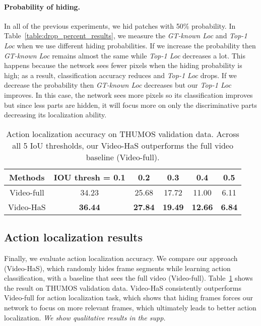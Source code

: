 \vspace{-10pt}
\paragraph{Probability of hiding.} In all of the previous experiments, we hid patches with 50\% probability. In Table~\ref{table:drop_percent_results}, we measure the \emph{GT-known Loc} and \emph{Top-1 Loc} when we use different hiding probabilities.  If we increase the probability then \emph{GT-known Loc} remains almost the same while \emph{Top-1 Loc} decreases a lot. This happens because the network sees fewer pixels when the hiding probability is high; as a result, classification accuracy reduces and \emph{Top-1 Loc} drops.  If we decrease the probability then \emph{GT-known Loc} decreases but our \emph{Top-1 Loc} improves.  In this case, the network sees more pixels so its classification improves but since less parts are hidden, it will focus more on only the discriminative parts decreasing its localization ability.


\begin{table}[t!]
              \begin{center}
                  \footnotesize
                  \begin{tabular}{| c | c | c| c| c| c|}
                  \hline    	
	                Methods     & IOU thresh = 0.1 & 0.2 & 0.3 & 0.4 & 0.5 \\
	                \hline
					Video-full & 34.23 &   25.68 &   17.72   & 11.00 &   6.11\\
					Video-HaS & \textbf{36.44}   & \textbf{27.84} &   \textbf{19.49} &   \textbf{12.66}  &  \textbf{6.84}\\
					 \hline
					                   \end{tabular}

      \caption{Action localization accuracy on THUMOS validation data.   Across all 5 IoU thresholds, our Video-HaS outperforms the full video baseline (Video-full).}
                          \label{table:frame_hide}
                          \end{center}
                          \vspace*{-0.2in}
                          \end{table}
                          					
\subsection{Action localization results}

Finally, we evaluate action localization accuracy.  We compare our approach (Video-HaS), which randomly hides frame segments while learning action classification, with a baseline that sees the full video (Video-full).  Table~\ref{table:frame_hide} shows the result on THUMOS validation data.  Video-HaS consistently outperforms Video-full for action localization task, which shows that hiding frames forces our network to focus on more relevant frames, which ultimately leads to better action localization.  \emph{We show qualitative results in the supp.}

